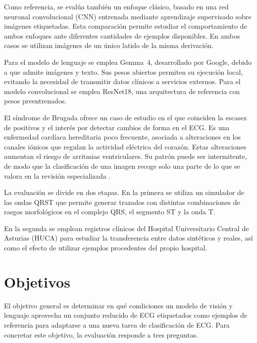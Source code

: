 Como referencia, se evalúa también un enfoque clásico, basado en una red neuronal convolucional (CNN) entrenada mediante aprendizaje supervisado sobre imágenes etiquetadas. Esta comparación permite estudiar el comportamiento de ambos enfoques ante diferentes cantidades de ejemplos disponibles. En ambos casos se utilizan imágenes de un único latido de la misma derivación.

Para el modelo de lenguaje se emplea Gemma~4, desarrollado por Google, debido a que admite imágenes y texto. Sus pesos abiertos permiten su ejecución local, evitando la necesidad de transmitir datos clínicos a servicios externos. Para el modelo convolucional se emplea ResNet18, una arquitectura de referencia con pesos preentrenados.

El síndrome de Brugada ofrece un caso de estudio en el que coinciden la escasez de positivos y el interés por detectar cambios de forma en el ECG. Es una enfermedad cardíaca hereditaria poco frecuente, asociada a alteraciones en los canales iónicos que regulan la actividad eléctrica del corazón. Estas alteraciones aumentan el riesgo de arritmias ventriculares. Su patrón puede ser intermitente, de modo que la clasificación de una imagen recoge solo una parte de lo que se valora en la revisión especializada \cite{zeppenfeld2022,wilde2023scbt}.

La evaluación se divide en dos etapas. En la primera se utiliza un simulador de las ondas QRST que permite generar trazados con distintas combinaciones de rasgos morfológicos en el complejo QRS, el segmento ST y la onda T.

\begin{samepage}
En la segunda se emplean registros clínicos del Hospital Universitario Central de Asturias (HUCA) para estudiar la transferencia entre datos sintéticos y reales, así como el efecto de utilizar ejemplos procedentes del propio hospital.
\par
\end{samepage}

\section{Objetivos}

El objetivo general es determinar en qué condiciones un modelo de visión y lenguaje aprovecha un conjunto reducido de ECG etiquetados como ejemplos de referencia para adaptarse a una nueva tarea de clasificación de ECG. Para concretar este objetivo, la evaluación responde a tres preguntas.

